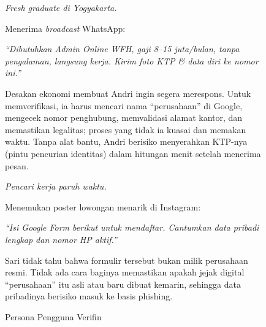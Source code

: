 \documentclass[12pt,a4paper]{article}
\begin{document}
\begin{figure}[H]
\centering
\begin{adjustwidth}{0.50cm}{0pt}
\begin{tcbraster}[raster columns=2, raster equal height=rows, raster column skip=4mm,
  enhanced, colback=verfinblue!4, colframe=verfinblue!55, colbacktitle=verfinblue!85,
  coltitle=white, fonttitle=\bfseries\footnotesize, left=2mm, right=2mm, top=1.2mm,
  bottom=1.2mm, boxrule=0.6pt, arc=1.5mm, title filled]
\begin{tcolorbox}[title={Persona 1 \,\textbullet\, Andri (22)}]
\footnotesize
\textit{Fresh graduate di Yogyakarta.}
\smallskip

Menerima \textit{broadcast} WhatsApp:
\begin{tcolorbox}[colback=white, colframe=verfinblue!25, boxrule=0.4pt, arc=1mm,
  left=1.5mm, right=1.5mm, top=0.8mm, bottom=0.8mm]
\itshape\footnotesize ``Dibutuhkan Admin Online WFH, gaji 8--15 juta/bulan, tanpa pengalaman,
langsung kerja. Kirim foto KTP \& data diri ke nomor ini.''
\end{tcolorbox}
Desakan ekonomi membuat Andri ingin segera merespons. Untuk memverifikasi, ia harus mencari nama
``perusahaan'' di Google, mengecek nomor penghubung, memvalidasi alamat kantor, dan memastikan
legalitas; proses yang tidak ia kuasai dan memakan waktu. Tanpa alat bantu, Andri berisiko
menyerahkan KTP-nya (pintu pencurian identitas) dalam hitungan menit setelah menerima pesan.
\end{tcolorbox}
\begin{tcolorbox}[title={Persona 2 \,\textbullet\, Sari (27)}]
\footnotesize
\textit{Pencari kerja paruh waktu.}
\smallskip

Menemukan poster lowongan menarik di Instagram:
\begin{tcolorbox}[colback=white, colframe=verfinblue!25, boxrule=0.4pt, arc=1mm,
  left=1.2mm, right=1.2mm, top=0.8mm, bottom=0.8mm]
\raggedright\itshape\footnotesize ``Isi Google Form berikut untuk mendaftar. Cantumkan data pribadi lengkap
dan nomor HP aktif.''
\end{tcolorbox}
Sari tidak tahu bahwa formulir tersebut bukan milik perusahaan resmi. Tidak ada cara baginya
memastikan apakah jejak digital ``perusahaan'' itu asli atau baru dibuat kemarin, sehingga data
pribadinya berisiko masuk ke basis phishing.
\end{tcolorbox}
\end{tcbraster}
\end{adjustwidth}
  \caption{Persona Pengguna Verifin}
  \label{fig:persona}
\end{figure}
\end{document}
